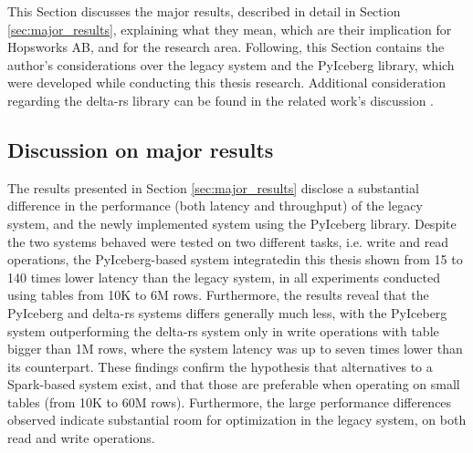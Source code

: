 This Section discusses the major results, described in detail in Section \ref{sec:major_results}, explaining what they mean, which are their implication for Hopsworks AB, and for the research area. Following, this Section contains the author's considerations over the legacy system and the PyIceberg library, which were developed while conducting this thesis research. Additional consideration regarding the delta-rs library can be found in the related work's discussion \cite{manfrediReducingReadWrite2024}.



\subsection{Discussion on major results}
The results presented in Section \ref{sec:major_results} disclose a substantial difference in the performance (both latency and throughput) of the legacy system, and the newly implemented system using the PyIceberg library. Despite the two systems behaved were tested on two different tasks, i.e. write and read operations, the PyIceberg-based system integratedin this thesis shown from 15 to 140 times lower latency than the legacy system, in all experiments conducted using tables from 10K to 6M rows. Furthermore, the results reveal that the PyIceberg and delta-rs systems differs generally much less, with the PyIceberg system outperforming the delta-rs system only in write operations with table bigger than 1M rows, where the system latency was up to seven times lower than its counterpart. These findings confirm the hypothesis that alternatives to a Spark-based system exist, and that those are preferable when operating on small tables (from 10K to 60M rows). Furthermore, the large performance differences observed indicate substantial room for optimization in the legacy system, on both read and write operations.

